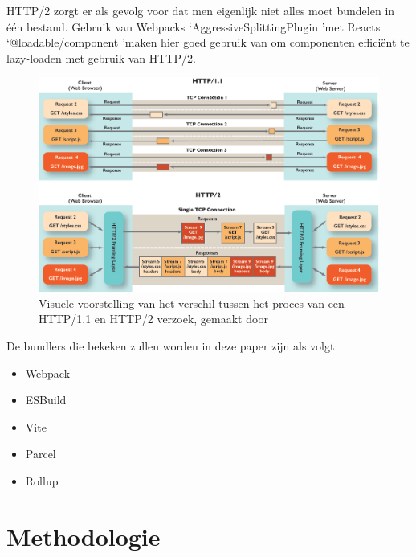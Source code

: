 HTTP/2 zorgt er als gevolg voor dat men eigenlijk niet alles moet bundelen in één bestand. Gebruik van Webpacks \lq AggressiveSplittingPlugin \rq met Reacts \lq @loadable/component \rq maken hier goed gebruik van om componenten efficiënt te lazy-loaden met gebruik van HTTP/2. \autocite{fraser_2020}

\begin{figure}[!htp]
  \includegraphics[width=\linewidth]{voorstel/img/http.png}
  \caption{Visuele voorstelling van het verschil tussen het proces van een HTTP/1.1 en HTTP/2 verzoek, gemaakt door \cite{pollard_2018}}
  \label{fig:HttpComparison}
\end{figure}

De bundlers die bekeken zullen worden in deze paper zijn als volgt:

\begin{itemize}
    \item Webpack
    \item ESBuild
    \item Vite
    \item Parcel
    \item Rollup
\end{itemize}



\section{Methodologie}
\label{sec:methodologie}

